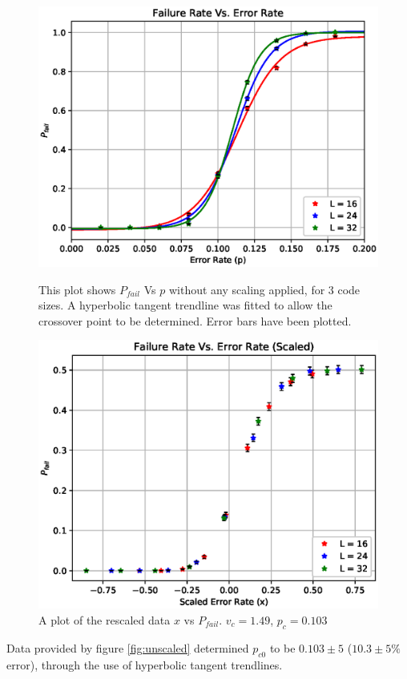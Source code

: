 	\begin{figure}[htpb]
	\begin{minipage}[t]{0.48\textwidth}
		\centering
		\includegraphics[width = \textwidth]{figs/unscaled.eps}
		\caption{This plot shows $P_{fail}$ Vs $p$ without any scaling applied, for 3 code sizes. A hyperbolic tangent trendline was fitted to allow the crossover point to be determined. Error bars have been plotted.}
		\label{fig:unscaled}
	\end{minipage}\hfill
	\begin{minipage}[t]{0.48\textwidth}
		\centering
			\includegraphics[width = \textwidth]{figs/scaled.eps}
			\caption{A plot of the rescaled data $x$ vs $P_{fail}$. $v_c = 1.49$, $p_c = 0.103$}
			\label{fig:scaled}
	\end{minipage}
	
	\end{figure}
	Data provided by figure \ref{fig:unscaled} determined $p_{c0}$ to be $0.103\pm 5$ ($10.3\pm 5 \%$ error), through the use of hyperbolic tangent trendlines.

